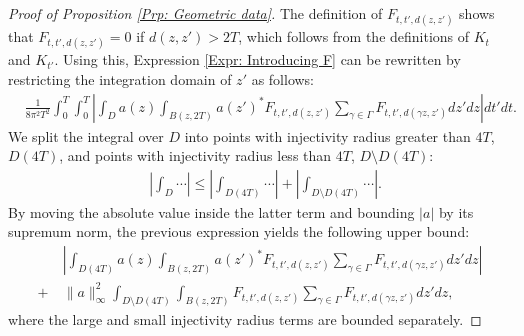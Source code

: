 \documentclass[11pt,twoside,reqno]{amsart} \usepackage{a4wide} \usepackage[T1]{fontenc} \usepackage[utf8]{inputenc} \usepackage{soul}  \usepackage{amsmath} \usepackage{amsfonts} \usepackage{amssymb} \usepackage{mathtools} \usepackage{amsthm} \usepackage{xcolor} \usepackage{graphicx} \usepackage{hyperref} \usepackage{standalone} \usepackage{esint} \usepackage{comment} \usepackage[left=2.3cm,top=3cm,right=2.3cm]{geometry} \usepackage{bm} \usepackage{svg} \usepackage{float} \numberwithin{equation}{section} \theoremstyle{plain} \newtheorem{thm}{Theorem}[section] \newtheorem{theorem}[thm]{Theorem} \newtheorem*{theorem*}{Theorem}\newtheorem{conj}[thm]{Conjecture} \newtheorem{lemma}[thm]{Lemma} \newtheorem{prop}[thm]{Proposition} \newtheorem{proposition}[thm]{Proposition} \newtheorem{cor}[thm]{Corollary} \newtheorem{question}[thm]{Question} \newtheorem{corollary}[thm]{Corollary} \newtheorem{assumption}[thm]{Assumption} \theoremstyle{definition} \newtheorem{defn}[thm]{Definition} \newtheorem{choice}[thm]{Choice} \newtheorem{definition}[thm]{Definition} \newtheorem{ex}[thm]{Example} \newtheorem{notation}[thm]{Notation} \newtheorem*{ack}{Acknowledgements} \theoremstyle{remark} \newtheorem{remark}[thm]{Remark} \newtheorem{bigremark}[thm]{Remark} \usepackage{xcolor} \newcommand{\red}[1]{ {\color{Red}#1} } \newcommand{\blue}[1]{ {\color{Blue}#1} } \author{Kai Hippi} \address{Aalto University, Espoo, Finland} \email{kai.hippi@aalto.fi}
\begin{document}
\begin{proof}[Proof of Proposition \ref{Prp: Geometric data}]
The definition of $ F_{t,t', d( z,z' )} $ shows that $ F_{t,t',d( z,z' )} = 0 $ if $ d( z,z' ) > 2T $, which follows from the definitions of $ K_{t} $ and $ K_{t'} $. Using this, Expression \eqref{Expr: Introducing F} can be rewritten by restricting the integration domain of \(z'\) as follows:
\begin{align}
	&
	\label{Expr: Before large small InjRad split}
	\frac{1}{8 \pi^{2} T^{2}} \int_{0}^{T} \int_{0}^{T} \left| \int_{D} a( z ) \int_{ B( z, 2T ) } a( z' )^{*}   F_{t,t', d( z,z' )}  \sum_{\gamma \in \Gamma}^{} F_{t,t', d( \gamma z, z' )} dz' dz \right| dt' dt.
\end{align}
We split the integral over $ D $ into points with injectivity radius greater than $ 4T $, $ D( 4T ) $, and points with injectivity radius less than $ 4T $, $ D \setminus D( 4T ) $:
\begin{align*}
	&
	\left| \int_{D} \cdots \right| \leq
	\left| \int_{D( 4T )} \cdots \right| 
	+  \left| \int_{D \setminus D( 4T )} \cdots \right|.
\end{align*}
By moving the absolute value inside the latter term and bounding \( |a| \) by its supremum norm, the previous expression yields the following upper bound:
\begin{align}
	&
	\nonumber
	\left| \int_{D( 4T )} a( z ) \int_{ B( z, 2T ) } a( z' )^{*}   F_{t,t', d( z,z' )}  \sum_{\gamma \in \Gamma}^{} F_{t,t', d( \gamma z, z' )} dz' dz \right| 
	\\
	+ \ & 
	\| a \|_{\infty}^{2} \int_{D \setminus D( 4T )} \int_{ B( z, 2T ) }  F_{t,t', d( z,z' )}  \sum_{\gamma \in \Gamma}^{} F_{t,t', d( \gamma z, z' )} dz' dz,
\end{align}
where the large and small injectivity radius terms are bounded separately. 


\end{proof}
\end{document}
